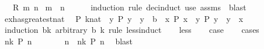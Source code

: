 \begin{isabellebody}
\ \ \ {\isachardoublequoteopen}R\ m\ n{\isachardoublequoteclose}\isanewline
%
\isadelimproof
%
\endisadelimproof
%
\isatagproof
{}\isamarkupfalse%
\ {\isacartoucheopen}m\ {\isasymle}\ n{\isacartoucheclose}\ \ \isanewline
\ \ \isamarkupfalse%
\ {\isacharparenleft}{\kern0pt}induction\ rule{\isacharcolon}{\kern0pt}\ dec{\isacharunderscore}{\kern0pt}induct{\isacharparenright}{\kern0pt}\ {\isacharparenleft}{\kern0pt}use\ assms\ \ blast{\isacharparenright}{\kern0pt}{\isacharplus}{\kern0pt}%
\endisatagproof
{\isafoldproof}%
%
\isadelimproof
%
\endisadelimproof
%
\isadelimdocument
%
\endisadelimdocument
%
\isatagdocument
%
\isamarkuptrue%
%
\endisatagdocument
{\isafolddocument}%
%
\isadelimdocument
%
\endisadelimdocument
{}\isamarkupfalse%
\ ex{\isacharunderscore}{\kern0pt}has{\isacharunderscore}{\kern0pt}greatest{\isacharunderscore}{\kern0pt}nat{\isacharcolon}{\kern0pt}\isanewline
\ \ {\isachardoublequoteopen}P\ {\isacharparenleft}{\kern0pt}k{\isacharcolon}{\kern0pt}{\isacharcolon}{\kern0pt}nat{\isacharparenright}{\kern0pt}\ {\isasymLongrightarrow}\ {\isasymforall}y{\isachardot}{\kern0pt}\ P\ y\ {\isasymlongrightarrow}\ y\ {\isasymle}\ b\ {\isasymLongrightarrow}\ {\isasymexists}x{\isachardot}{\kern0pt}\ P\ x\ {\isasymand}\ {\isacharparenleft}{\kern0pt}{\isasymforall}y{\isachardot}{\kern0pt}\ P\ y\ {\isasymlongrightarrow}\ y\ {\isasymle}\ x{\isacharparenright}{\kern0pt}{\isachardoublequoteclose}\isanewline
%
\isadelimproof
%
\endisadelimproof
%
\isatagproof
{}\isamarkupfalse%
\ {\isacharparenleft}{\kern0pt}induction\ {\isachardoublequoteopen}b{\isacharminus}{\kern0pt}k{\isachardoublequoteclose}\ arbitrary{\isacharcolon}{\kern0pt}\ b\ k\ rule{\isacharcolon}{\kern0pt}\ less{\isacharunderscore}{\kern0pt}induct{\isacharparenright}{\kern0pt}\isanewline
\ \ \isamarkupfalse%
\ less\isanewline
\ \ \isamarkupfalse%
\ {\isacharquery}{\kern0pt}case\isanewline
\ \ \isamarkupfalse%
\ cases\isanewline
\ \ \ \ \isamarkupfalse%
\ {\isachardoublequoteopen}{\isasymexists}n{\isachargreater}{\kern0pt}k{\isachardot}{\kern0pt}\ P\ n{\isachardoublequoteclose}\isanewline
\ \ \ \ \isamarkupfalse%
\ \isamarkupfalse%
\ n\ \ {\isachardoublequoteopen}n{\isachargreater}{\kern0pt}k{\isachardoublequoteclose}\ {\isachardoublequoteopen}P\ n{\isachardoublequoteclose}\ \isamarkupfalse%
\ blast\isanewline
\ \ \ \ \isamarkupfalse%

\end{isabellebody}
